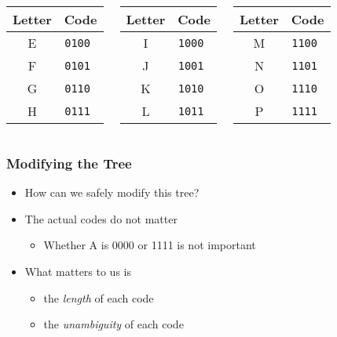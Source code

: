 \documentclass{../ucll-slides}
\begin{document}
\begin{frame}
\begin{columns}
    \column{3cm}
    \begin{center}
      \begin{tabular}{cc}
        \textbf{Letter} & \textbf{Code} \\
        \toprule
        E & \tt 0100 \\
        F & \tt 0101 \\
        G & \tt 0110 \\
        H & \tt 0111 \\
      \end{tabular}
    \end{center}

    \column{3cm}
    \begin{center}
      \begin{tabular}{cc}
        \textbf{Letter} & \textbf{Code} \\
        \toprule
        I & \tt 1000 \\
        J & \tt 1001 \\
        K & \tt 1010 \\
        L & \tt 1011 \\
      \end{tabular}
    \end{center}

    \column{3cm}
    \begin{center}
      \begin{tabular}{cc}
        \textbf{Letter} & \textbf{Code} \\
        \toprule
        M & \tt 1100 \\
        N & \tt 1101 \\
        O & \tt 1110 \\
        P & \tt 1111 \\
      \end{tabular}
    \end{center}
  \end{columns}
\end{frame}

\begin{frame}
  \frametitle{Modifying the Tree}
  \begin{itemize}
    \item How can we safely modify this tree?
          \vskip4mm
    \item The actual codes do not matter
          \begin{itemize}
            \item Whether A is 0000 or 1111 is not important
          \end{itemize}
          \vskip4mm
    \item What matters to us is
          \begin{itemize}
            \item the \emph{length} of each code
            \item the \emph{unambiguity} of each code
          \end{itemize}
  \end{itemize}
\end{frame}
\end{document}
